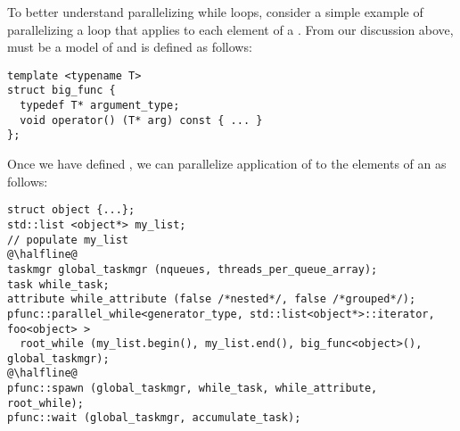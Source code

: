 %
To better understand parallelizing while loops, consider a simple example of
parallelizing a loop that applies  to each element of a
.
%
From our discussion above,  must be a model of
 and is defined as follows:
%
\begin{center}
\begin{minipage}{0.45\textwidth}
\begin{lstlisting}
template <typename T>
struct big_func { 
  typedef T* argument_type;
  void operator() (T* arg) const { ... }
};
\end{lstlisting}
\end{minipage}
\end{center}
%
Once we have defined , we can parallelize application of 
 to the elements of an  as follows:
%
\begin{center}
\begin{minipage}{0.7\textwidth}
\begin{lstlisting}
struct object {...};
std::list <object*> my_list;
// populate my_list
@\halfline@
taskmgr global_taskmgr (nqueues, threads_per_queue_array);
task while_task;
attribute while_attribute (false /*nested*/, false /*grouped*/);
pfunc::parallel_while<generator_type, std::list<object*>::iterator, foo<object> > 
  root_while (my_list.begin(), my_list.end(), big_func<object>(), global_taskmgr);
@\halfline@
pfunc::spawn (global_taskmgr, while_task, while_attribute, root_while);
pfunc::wait (global_taskmgr, accumulate_task);
\end{lstlisting}
\end{minipage}
\end{center}
